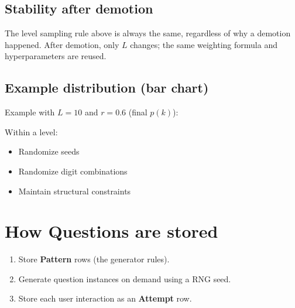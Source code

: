 \documentclass[11pt]{article}
\begin{document}
\subsection*{Stability after demotion}

The level sampling rule above is always the same, regardless of why a demotion happened.
After demotion, only $L$ changes; the same weighting formula and hyperparameters are reused.

\subsection*{Example distribution (bar chart)}

Example with $L=10$ and $r=0.6$ (final $p(k)$):

\begin{center}
\end{center}

Within a level:

\begin{itemize}[leftmargin=*]
    \item Randomize seeds
    \item Randomize digit combinations
    \item Maintain structural constraints
\end{itemize}



\section{How Questions are stored}

\begin{enumerate}[leftmargin=*]
    \item Store \textbf{Pattern} rows (the generator rules).
    \item Generate question instances on demand using a RNG seed.
    \item Store each user interaction as an \textbf{Attempt} row.
\end{enumerate}
\end{document}
